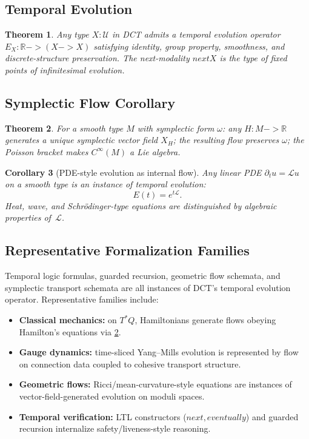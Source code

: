 \documentclass[11pt,a4paper]{article}
\def\to{->}%
\def\bigcirc{next}%
\def\Diamond{eventually}%
\theoremstyle{plain}
\newtheorem{theorem}{Theorem}[section]
\newtheorem{corollary}[theorem]{Corollary}
\theoremstyle{definition}
\theoremstyle{remark}
\newcommand{\R}{\mathbb{R}}
\newcommand{\U}{\mathcal{U}}
\begin{document}
\subsection{Temporal Evolution}

\begin{theorem}
\label{thm:temporal}
Any type $X : \U$ in DCT admits a temporal evolution operator $E_X : \R \to (X \to X)$ satisfying identity, group property, smoothness, and discrete-structure preservation.
The next-modality $\bigcirc X$ is the type of fixed points of infinitesimal evolution.
\end{theorem}

\subsection{Symplectic Flow Corollary}

\begin{theorem}
\label{thm:symplectic-flow}
For a smooth type $M$ with symplectic form $\omega$:
any $H : M \to \R$ generates a unique symplectic vector field $X_H$;
the resulting flow preserves $\omega$;
the Poisson bracket makes $C^\infty(M)$ a Lie algebra.
\end{theorem}

\begin{corollary}[PDE-style evolution as internal flow]
Any linear PDE $\partial_t u = \mathcal{L}u$ on a smooth type is an instance of temporal evolution:
\[
E(t) = e^{t\mathcal{L}}.
\]
Heat, wave, and Schr\"odinger-type equations are distinguished by algebraic properties of~$\mathcal{L}$.
\end{corollary}

\subsection{Representative Formalization Families}

Temporal logic formulas, guarded recursion, geometric flow schemata, and symplectic transport schemata are all instances of DCT's temporal evolution operator.
Representative families include:
\begin{itemize}[nosep]
    \item \textbf{Classical mechanics:} on $T^*Q$, Hamiltonians generate flows obeying Hamilton's equations via \cref{thm:symplectic-flow}.
    \item \textbf{Gauge dynamics:} time-sliced Yang--Mills evolution is represented by flow on connection data coupled to cohesive transport structure.
    \item \textbf{Geometric flows:} Ricci/mean-curvature-style equations are instances of vector-field-generated evolution on moduli spaces.
    \item \textbf{Temporal verification:} LTL constructors ($\bigcirc,\Diamond$) and guarded recursion internalize safety/liveness-style reasoning.
\end{itemize}
\end{document}
